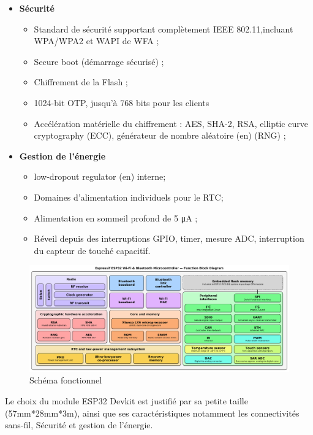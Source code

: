 \begin{itemize}
    \item[\textbullet]\textbf{Sécurité}   
        \begin{itemize}
            \item Standard de sécurité supportant complètement IEEE 802.11,incluant WPA/WPA2 et WAPI de WFA ;
            \item Secure boot (démarrage sécurisé) ;
            \item Chiffrement de la Flash ;
            \item 1024-bit OTP, jusqu'à 768 bits pour les clients
            \item Accélération matérielle du chiffrement : AES, SHA-2, RSA, elliptic curve cryptography (ECC), générateur de nombre aléatoire (en) (RNG) ;
        \end{itemize}
    \item[\textbullet]\textbf{Gestion de l'énergie}

        \begin{itemize}
            \item low-dropout regulator (en) interne;
            \item Domaines d'alimentation individuels pour le RTC;
            \item Alimentation en sommeil profond de 5 μA ;
            \item Réveil depuis des interruptions GPIO, timer, mesure ADC, interruption du capteur de touché capacitif.
        \end{itemize}
\end{itemize}
     
    
\begin{figure}[h!]
    \centering
    \includegraphics[scale=0.26 ]{images/esp32_fun.png}
    \caption{Schéma fonctionnel}
    \label{fig50}
\end{figure}

Le choix du module ESP32 Devkit est justifié par sa petite taille 
(57mm*28mm*3m), ainsi que ses caractéristiques notamment les connectivités 
sans-fil, Sécurité et gestion de l’énergie.

